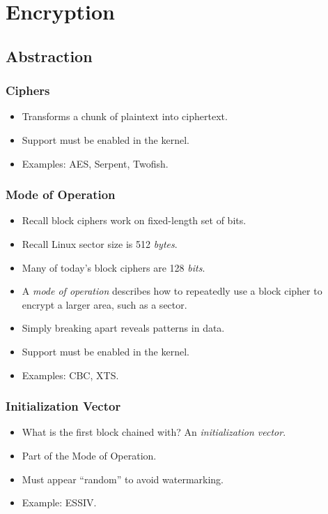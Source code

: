 \documentclass[xcolor={dvipsnames,svgnames},hyperref=dvips]{beamer}
\begin{document}
\section{Encryption}\label{section:encryption}
	\subsection{Abstraction}
	\begin{frame}
		\frametitle{Ciphers}
		\begin{itemize}
		\item Transforms a chunk of plaintext into ciphertext.
		\item Support must be enabled in the kernel.
		\item Examples: AES, Serpent, Twofish.
		\end{itemize}
	\end{frame}

	\begin{frame}
		\frametitle{Mode of Operation}
		\begin{itemize}
		\item Recall block ciphers work on fixed-length set of bits.
		\item Recall Linux sector size is 512 \textit{bytes}.
		\item Many of today's block ciphers are 128 \textit{bits}.
		\item A \textit{mode of operation} describes how to repeatedly use a block cipher to encrypt a larger area, such as a sector.
		\item Simply breaking apart reveals patterns in data.
		\item Support must be enabled in the kernel.
		\item Examples: CBC, XTS.
		\end{itemize}
	\end{frame}

	\begin{frame}
		\frametitle{Initialization Vector}
		\begin{itemize}
		\item What is the first block chained with? An \textit{initialization vector}.
		\item Part of the Mode of Operation.
		\item Must appear ``random'' to avoid watermarking.
		\item Example: ESSIV.
		\end{itemize}
	\end{frame}
\end{document}
